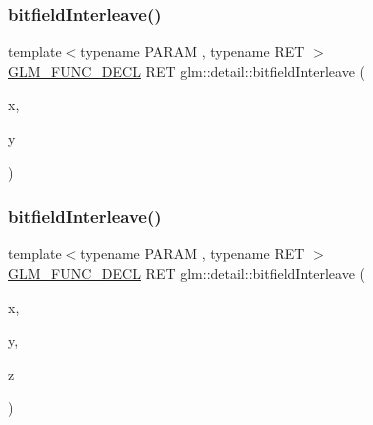 \subsubsection{\texorpdfstring{bitfieldInterleave()}{bitfieldInterleave()}\hspace{0.1cm}{\footnotesize\ttfamily [1/11]}}
{\footnotesize\ttfamily template$<$typename P\+A\+R\+AM , typename R\+ET $>$ \\
\mbox{\hyperlink{setup_8hpp_ab2d052de21a70539923e9bcbf6e83a51}{G\+L\+M\+\_\+\+F\+U\+N\+C\+\_\+\+D\+E\+CL}} R\+ET glm\+::detail\+::bitfield\+Interleave (\begin{DoxyParamCaption}\item[{P\+A\+R\+AM}]{x,  }\item[{P\+A\+R\+AM}]{y }\end{DoxyParamCaption})}

\mbox{\label{namespaceglm_1_1detail_aa2fdd8f720417a13990873ba704a3426}} 
\subsubsection{\texorpdfstring{bitfieldInterleave()}{bitfieldInterleave()}\hspace{0.1cm}{\footnotesize\ttfamily [2/11]}}
{\footnotesize\ttfamily template$<$typename P\+A\+R\+AM , typename R\+ET $>$ \\
\mbox{\hyperlink{setup_8hpp_ab2d052de21a70539923e9bcbf6e83a51}{G\+L\+M\+\_\+\+F\+U\+N\+C\+\_\+\+D\+E\+CL}} R\+ET glm\+::detail\+::bitfield\+Interleave (\begin{DoxyParamCaption}\item[{P\+A\+R\+AM}]{x,  }\item[{P\+A\+R\+AM}]{y,  }\item[{P\+A\+R\+AM}]{z }\end{DoxyParamCaption})}

\mbox{\label{namespaceglm_1_1detail_a606f6dc8c8314159fafef68f820c2c65}} 
